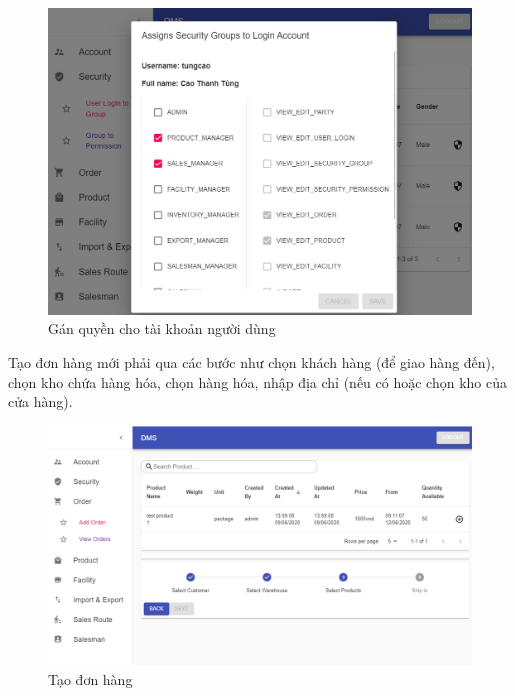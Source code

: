 \begin{figure}[H]
\centering
\includegraphics[width=15cm]{images/demo/user-login-to-group.png}
\caption{Gán quyền cho tài khoản người dùng}
\end{figure}

Tạo đơn hàng mới phải qua các bước như chọn khách hàng
(để giao hàng đến), chọn kho chứa hàng hóa, chọn hàng
hóa, nhập địa chỉ (nếu có hoặc chọn kho của cửa hàng).
\begin{figure}[H]
\centering
\includegraphics[width=15cm]{images/demo/add-order.png}
\caption{Tạo đơn hàng}
\end{figure}

